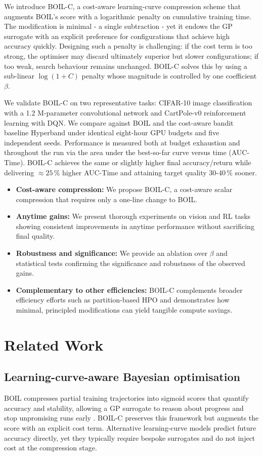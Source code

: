 \documentclass{article} %
\begin{document}
We introduce BOIL-C, a cost-aware learning-curve compression scheme that augments BOIL's score with a logarithmic penalty on cumulative training time. The modification is minimal - a single subtraction - yet it endows the GP surrogate with an explicit preference for configurations that achieve high accuracy quickly. Designing such a penalty is challenging: if the cost term is too strong, the optimiser may discard ultimately superior but slower configurations; if too weak, search behaviour remains unchanged. BOIL-C solves this by using a sub-linear \(\log(1+C)\) penalty whose magnitude is controlled by one coefficient \(\beta\).

We validate BOIL-C on two representative tasks: CIFAR-10 image classification with a 1.2 M-parameter convolutional network and CartPole-v0 reinforcement learning with DQN. We compare against BOIL and the cost-aware bandit baseline Hyperband under identical eight-hour GPU budgets and five independent seeds. Performance is measured both at budget exhaustion and throughout the run via the area under the best-so-far curve versus time (AUC-Time). BOIL-C achieves the same or slightly higher final accuracy/return while delivering \(\approx 25\,\%\) higher AUC-Time and attaining target quality 30-40\,\% sooner.

\begin{itemize}
\item \textbf{Cost-aware compression:} We propose BOIL-C, a cost-aware scalar compression that requires only a one-line change to BOIL.
\item \textbf{Anytime gains:} We present thorough experiments on vision and RL tasks showing consistent improvements in anytime performance without sacrificing final quality.
\item \textbf{Robustness and significance:} We provide an ablation over \(\beta\) and statistical tests confirming the significance and robustness of the observed gains.
\item \textbf{Complementary to other efficiencies:} BOIL-C complements broader efficiency efforts such as partition-based HPO \cite{mlodozeniec-2023-hyperparameter} and demonstrates how minimal, principled modifications can yield tangible compute savings.
\end{itemize}

\section{Related Work}
\label{sec:related}
\subsection{Learning-curve-aware Bayesian optimisation}
BOIL compresses partial training trajectories into sigmoid scores that quantify accuracy and stability, allowing a GP surrogate to reason about progress and stop unpromising runs early \cite{nguyen-2019-bayesian}. BOIL-C preserves this framework but augments the score with an explicit cost term. Alternative learning-curve models predict future accuracy directly, yet they typically require bespoke surrogates and do not inject cost at the compression stage.
\end{document}
